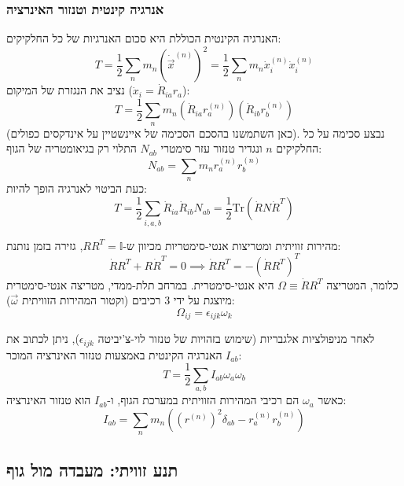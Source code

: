 \subsubsection{אנרגיה קינטית וטנזור האינרציה}
האנרגיה הקינטית הכוללת היא סכום האנרגיות של כל החלקיקים:
\begin{equation}
    T = \frac{1}{2} \sum_n m_n \left( \dot{\vec{x}}^{(n)} \right)^2 = \frac{1}{2} \sum_n m_n \dot{x}^{(n)}_i \dot{x}^{(n)}_i
\end{equation}
נציב את הנגזרת של המיקום ($\dot{x}_i = \dot{R}_{ia} r_a$):
\begin{equation}
    T = \frac{1}{2} \sum_n m_n (\dot{R}_{ia} r^{(n)}_a) (\dot{R}_{ib} r^{(n)}_b)
\end{equation}
(כאן השתמשנו בהסכם הסכימה של איינשטיין על אינדקסים כפולים).
נבצע סכימה על כל החלקיקים $n$ ונגדיר טנזור עזר סימטרי $N_{ab}$ התלוי רק בגיאומטריה של הגוף:
\begin{equation}
    N_{ab} = \sum_n m_n r^{(n)}_a r^{(n)}_b
\end{equation}
כעת הביטוי לאנרגיה הופך להיות:
\begin{equation}
    T = \frac{1}{2} \sum_{i,a,b} \dot{R}_{ia} \dot{R}_{ib} N_{ab} = \frac{1}{2} \text{Tr} \left( \dot{R} N \dot{R}^T \right)
\end{equation}

\begin{notebox}{מהירות זוויתית ומטריצות אנטי-סימטריות}
מכיוון ש-$R R^T = \mathbb{I}$, גזירה בזמן נותנת:
$$ \dot{R} R^T + R \dot{R}^T = 0 \implies \dot{R} R^T = - (\dot{R} R^T)^T $$
כלומר, המטריצה $\Omega \equiv \dot{R} R^T$ היא אנטי-סימטרית. במרחב תלת-ממדי, מטריצה אנטי-סימטרית מיוצגת על ידי 3 רכיבים (וקטור המהירות הזוויתית $\vec{\omega}$):
$$ \Omega_{ij} = \epsilon_{ijk} \omega_k $$
\end{notebox}

לאחר מניפולציות אלגבריות (שימוש בזהויות של טנזור לוי-צ'יביטה $\epsilon_{ijk}$), ניתן לכתוב את האנרגיה הקינטית באמצעות טנזור האינרציה המוכר $I_{ab}$:
\begin{equation}
    T = \frac{1}{2} \sum_{a,b} I_{ab} \omega_a \omega_b
\end{equation}
כאשר $\omega_a$ הם רכיבי המהירות הזוויתית במערכת הגוף, ו-$I_{ab}$ הוא טנזור האינרציה:
\begin{equation}
    I_{ab} = \sum_n m_n \left( (r^{(n)})^2 \delta_{ab} - r^{(n)}_a r^{(n)}_b \right)
\end{equation}

\subsection{תנע זוויתי: מעבדה מול גוף}

